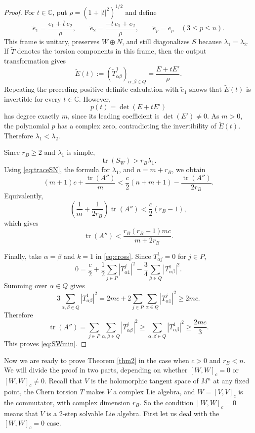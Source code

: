 \documentclass{amsart}
\newcommand{\C}{{\mathbb C}}
\begin{document}
\begin{proof}
For $t\in\C$, put $\rho=(1+|t|^2)^{1/2}$ and define
\[
\widetilde e_1=\frac{e_1+\overline t\,e_2}{\rho},
 \qquad
 \widetilde e_2=\frac{-t\,e_1+e_2}{\rho},
 \qquad
 \widetilde e_p=e_p\quad(3\leq p\leq n).
\]
This frame is unitary, preserves $W\oplus N$, and still diagonalizes
$S$ because $\lambda_1=\lambda_2$. If $\widetilde T$ denotes the
torsion components in this frame, then the output transformation gives
\[
\widetilde E(t)
 :=(\widetilde T^1_{\alpha\beta})_{\alpha,\beta\in Q}
 =\frac{E+tE'}{\rho}.
\]
Repeating the preceding positive-definite calculation with
$\widetilde e_1$ shows that $\widetilde E(t)$ is invertible for every
$t\in\C$. However,
\[
p(t)=\det(E+tE')
\]
has degree exactly $m$, since its leading coefficient is
$\det(E')\neq0$. As  $m>0$,  the polynomial $p$ has a complex zero,
contradicting the invertibility of $\widetilde E(t)$. Therefore
$\lambda_1<\lambda_2$.


Since $r_B\geq2$ and $\lambda_1$ is simple,
\[
\operatorname{tr}(S_W)>r_B\lambda_1.
\]
  Using \eqref{eq:traceSN}, the formula for $\lambda_1$, and $n=m+r_B$,
we obtain
\[
(m+1)c+\frac{\operatorname{tr}(A'')}{m}
 <\frac{c}{2}(n+m+1)-\frac{\operatorname{tr}(A'')}{2r_B}.
\]
Equivalently,
\[
\left(\frac{1}{m}+\frac{1}{2r_B}\right)\operatorname{tr}(A'')
 <\frac{c}{2}(r_B-1),
\]
which gives
\[
\operatorname{tr}(A'')<\frac{r_B(r_B-1)mc}{m+2r_B}.
\]

Finally, take $\alpha=\beta$  and $k=1$ in   \eqref{eq:cross}. Since
$T^1_{\alpha j}=0$ for $j\in P$,
\[
0=\frac{c}{2}
   +\frac{1}{2}\sum_{j\in P}|T^j_{\alpha1}|^2
   -\frac{3}{4}\sum_{\beta\in Q}|T^1_{\alpha\beta}|^2.
\]
Summing over $\alpha\in Q$ gives
\[
 3\sum_{\alpha,\beta\in Q}|T^1_{\alpha\beta}|^2
 =2mc+2\sum_{j\in P}\sum_{\alpha\in Q}|T^j_{\alpha1}|^2
 \geq2mc.
\]
Therefore
\[
\operatorname{tr}(A'')
 =\sum_{j\in P}\sum_{\alpha,\beta\in Q}
      |T^j_{\alpha\beta}|^2
 \geq\sum_{\alpha,\beta\in Q}|T^1_{\alpha\beta}|^2
 \geq\frac{2mc}{3}.
\]
This  proves \eqref{eq:SWmin}.
\end{proof}



Now we are ready to prove Theorem \ref{thm2} in the case when $c>0$ and $r_B<n$. We will divide the proof in two parts, depending on whether $[W,W]_c=0$ or $[W,W]_c\neq 0$. Recall that $V$ is the holomorphic tangent space of $M^n$ at any fixed point, the Chern torsion $T$ makes $V$ a complex Lie algebra, and $W=[V,V]_c$ is the commutator, with complex dimension $r_B$. So the condition $[W,W]_c=0$ means that $V$ is a $2$-step solvable Lie algebra. First let us deal with the $[W,W]_c=0$ case.
\end{document}
